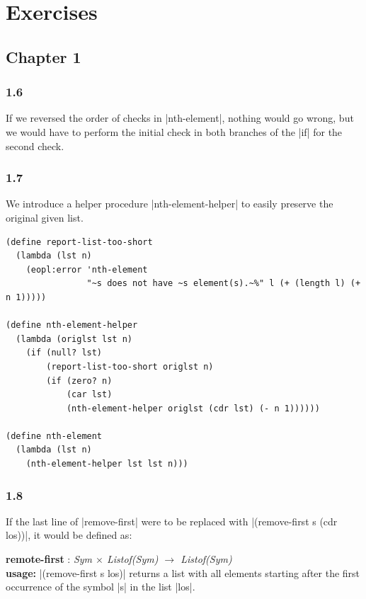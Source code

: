 \documentclass[a4paper]{article}
\begin{document}
\newpage

\section{Exercises}

\subsection{Chapter 1}

\subsubsection*{1.6}

If we reversed the order of checks in |nth-element|, nothing would go wrong, but we would have to perform the initial check in both branches of the |if| for the second check.

\subsubsection*{1.7}

We introduce a helper procedure |nth-element-helper| to easily preserve the original given list.

\begin{lstlisting}
(define report-list-too-short
  (lambda (lst n)
    (eopl:error 'nth-element
                "~s does not have ~s element(s).~%" l (+ (length l) (+ n 1)))))

(define nth-element-helper
  (lambda (origlst lst n)
    (if (null? lst)
        (report-list-too-short origlst n)
        (if (zero? n)
            (car lst)
            (nth-element-helper origlst (cdr lst) (- n 1))))))

(define nth-element
  (lambda (lst n)
    (nth-element-helper lst lst n)))
\end{lstlisting}

\subsubsection*{1.8}

If the last line of |remove-first| were to be replaced with |(remove-first s (cdr los))|, it would be defined as:

\textbf{remote-first} : \textit{Sym $\times$ Listof(Sym) $\rightarrow$ Listof(Sym)}\\
\textbf{usage:} |(remove-first s los)| returns a list with all elements starting after the first occurrence of the symbol |s| in the list |los|.
\end{document}
